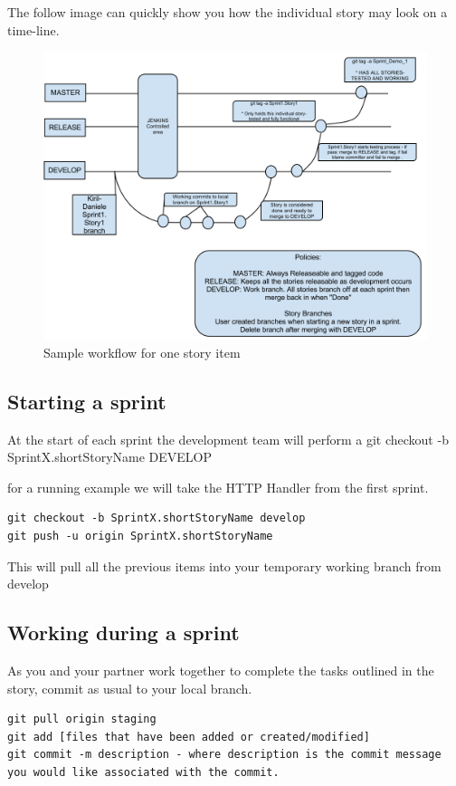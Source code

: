 \documentclass[11pt]{report}
\begin{document}
The follow image can quickly show you how the individual story may look on a time-line.
\begin{figure}[htb]
\centering
\includegraphics[width=1\textwidth]{workflow}
\caption{Sample workflow for one story item}
\label{fig:architecture}
\end{figure}


\subsection{Starting a sprint}

At the start of each sprint the development team will perform a git checkout -b SprintX.shortStoryName DEVELOP

for a running example we will take the HTTP Handler from the first sprint. 
\begin{verbatim}
git checkout -b SprintX.shortStoryName develop
git push -u origin SprintX.shortStoryName
\end{verbatim}
This will pull all the previous items into your temporary working branch from develop

\subsection{Working during a sprint}

As you and your partner work together to complete the tasks outlined in the story, commit as usual to your local branch.\\
\begin{verbatim}
git pull origin staging
git add [files that have been added or created/modified]
git commit -m description - where description is the commit message you would like associated with the commit. 
\end{verbatim}
\end{document}
